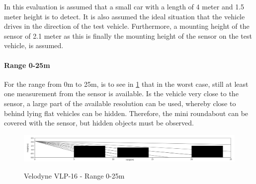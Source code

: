 \documentclass[11pt,oneside,openright]{mpreport}
\begin{document}

In this evaluation is assumed that a small car with a length of 4 meter and 1.5 meter height is to detect.
It is also assumed the ideal situation that the vehicle drives in the direction of the test vehicle.
Furthermore, a mounting height of the sensor of 2.1 meter as this is finally the mounting height of the sensor on the test vehicle, is assumed.

\paragraph{Range 0-25m}

For the range from 0m to 25m, is to see in \cref{velodyne_range_25} that in the worst case, still at least one measurement from the sensor is available. 
Is the vehicle very close to the sensor, a large part of the available resolution can be used, whereby close to behind lying flat vehicles can be hidden. 
Therefore, the mini roundabout can be covered with the sensor, but hidden objects must be observed.

\begin{figure}[!ht]
\caption{Velodyne VLP-16 - Range 0-25m}
\includegraphics[width=\textwidth]{bilder/range_25.png}
\label{velodyne_range_25}
\end{figure}
\end{document}
